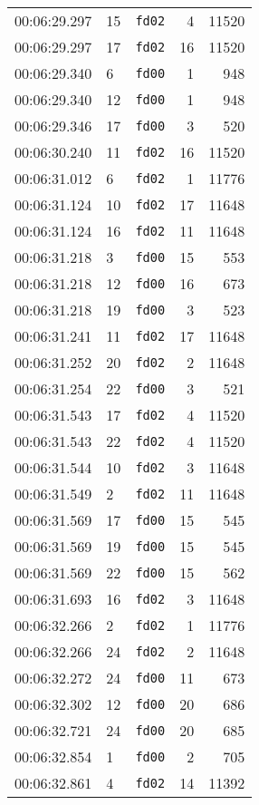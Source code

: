 \documentclass{article}
\begin{document}
\begin{longtable}{lllrr}
00:06:29.297 & 15 & \texttt{fd02} & 4 & 11520 \\
00:06:29.297 & 17 & \texttt{fd02} & 16 & 11520 \\
00:06:29.340 & 6 & \texttt{fd00} & 1 & 948 \\
00:06:29.340 & 12 & \texttt{fd00} & 1 & 948 \\
00:06:29.346 & 17 & \texttt{fd00} & 3 & 520 \\
00:06:30.240 & 11 & \texttt{fd02} & 16 & 11520 \\
00:06:31.012 & 6 & \texttt{fd02} & 1 & 11776 \\
00:06:31.124 & 10 & \texttt{fd02} & 17 & 11648 \\
00:06:31.124 & 16 & \texttt{fd02} & 11 & 11648 \\
00:06:31.218 & 3 & \texttt{fd00} & 15 & 553 \\
00:06:31.218 & 12 & \texttt{fd00} & 16 & 673 \\
00:06:31.218 & 19 & \texttt{fd00} & 3 & 523 \\
00:06:31.241 & 11 & \texttt{fd02} & 17 & 11648 \\
00:06:31.252 & 20 & \texttt{fd02} & 2 & 11648 \\
00:06:31.254 & 22 & \texttt{fd00} & 3 & 521 \\
00:06:31.543 & 17 & \texttt{fd02} & 4 & 11520 \\
00:06:31.543 & 22 & \texttt{fd02} & 4 & 11520 \\
00:06:31.544 & 10 & \texttt{fd02} & 3 & 11648 \\
00:06:31.549 & 2 & \texttt{fd02} & 11 & 11648 \\
00:06:31.569 & 17 & \texttt{fd00} & 15 & 545 \\
00:06:31.569 & 19 & \texttt{fd00} & 15 & 545 \\
00:06:31.569 & 22 & \texttt{fd00} & 15 & 562 \\
00:06:31.693 & 16 & \texttt{fd02} & 3 & 11648 \\
00:06:32.266 & 2 & \texttt{fd02} & 1 & 11776 \\
00:06:32.266 & 24 & \texttt{fd02} & 2 & 11648 \\
00:06:32.272 & 24 & \texttt{fd00} & 11 & 673 \\
00:06:32.302 & 12 & \texttt{fd00} & 20 & 686 \\
00:06:32.721 & 24 & \texttt{fd00} & 20 & 685 \\
00:06:32.854 & 1 & \texttt{fd00} & 2 & 705 \\
00:06:32.861 & 4 & \texttt{fd02} & 14 & 11392 \\

\end{longtable}
\end{document}
